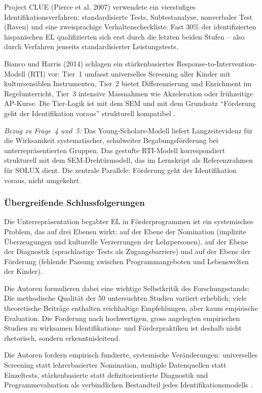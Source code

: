 \documentclass[ngerman, a4paper]{article}
\begin{document}
Project CLUE (Pierce et al. 2007) verwendete ein vierstufiges
Identifikationsverfahren: standardisierte Tests, Subtestanalyse,
nonverbaler Test (Raven) und eine zweisprachige Verhaltenscheckliste.
Fast 30\% der identifizierten hispanischen EL qualifizierten sich erst
durch die letzten beiden Stufen -- also durch Verfahren jenseits
standardisierter Leistungstests.

Bianco und Harris (2014) schlagen ein stärkenbasiertes
Response-to-Intervention-Modell (RTI) vor: Tier~1 umfasst universelles
Screening aller Kinder mit kultursensiblen Instrumenten, Tier~2 bietet
Differenzierung und Enrichment im Regelunterricht, Tier~3 intensive
Massnahmen wie Akzeleration oder frühzeitige AP-Kurse. Die Tier-Logik ist
mit dem SEM und mit dem Grundsatz \enquote{Förderung geht der Identifikation
  voraus} strukturell kompatibel
\parencite[S.\,444--454]{renzullireis2021rls}.

\textit{Bezug zu Frage~4 und~5:} Das Young-Scholars-Modell liefert
Langzeitevidenz für die Wirksamkeit systematischer, schulweiter
Begabungsförderung bei unterrepräsentierten Gruppen. Das gestufte
RTI-Modell korrespondiert strukturell mit dem SEM-Drehtürmodell, das im
Lernskript als Referenzrahmen für SOLUX dient. Die zentrale Parallele:
Förderung geht der Identifikation voraus, nicht umgekehrt.

\subsubsection*{Übergreifende Schlussfolgerungen}

Die Unterrepräsentation begabter EL in Förderprogrammen ist ein
systemisches Problem, das auf drei Ebenen wirkt: auf der Ebene der
Nomination (implizite Überzeugungen und kulturelle Verzerrungen der
Lehrpersonen), auf der Ebene der Diagnostik (sprachlastige Tests als
Zugangsbarriere) und auf der Ebene der Förderung (fehlende Passung
zwischen Programmangeboten und Lebenswelten der Kinder).

Die Autoren formulieren dabei eine wichtige Selbstkritik des
Forschungsstands: Die methodische Qualität der 50 untersuchten Studien
variiert erheblich; viele theoretische Beiträge enthalten reichhaltige
Empfehlungen, aber kaum empirische Evaluation. Die Forderung nach
hochwertigen, gross angelegten empirischen Studien zu wirksamen
Identifikations- und Förderpraktiken ist deshalb nicht rhetorisch,
sondern erkenntnisleitend.

Die Autoren
fordern empirisch fundierte, systemische Veränderungen: universelles
Screening statt lehrerbasierter Nomination, multiple Datenquellen statt
Einzeltests, stärkenbasierte statt defizitorientierte Diagnostik und
Programmevaluation als verbindlichen Bestandteil jedes
Identifikationsmodells \parencite[S.\,325]{mun2020identifying}.
\end{document}
